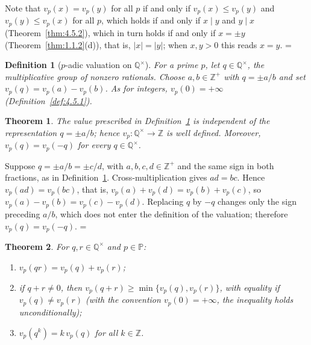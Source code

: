 \documentclass[11pt]{article}
\makeatletter
\theoremstyle{ntstyle}
\newtheorem{theorem}{Theorem}[subsection]
\newtheorem{definition}{Definition}[subsection]
\let\nt@closedisplay\]
\def\nt@guardedclose{\@ifnextchar\par{\nt@closeafterpar}{\@ifnextchar\end{\postdisplaypenalty\@M\nt@closedisplay}{\nt@closedisplay}}}
\def\nt@closeafterpar\par{\@ifnextchar\par{\nt@closeafterpar}{\@ifnextchar\end{\postdisplaypenalty\@M\nt@closedisplay\par}{\nt@closedisplay\par}}}
\renewenvironment{proof}[1][\proofname]{\par
  \pushQED{\qed}\normalfont\topsep\medskipamount\edef\nt@afterproof{\@endparpenalty=\the\@endparpenalty\relax}\@beginparpenalty\@M\@endparpenalty\@M\let\]\nt@guardedclose\trivlist\item[]\textit{#1\@addpunct{.}} \ignorespaces}{\ifvmode\addpenalty\@M\fi\popQED\nt@afterproof\endtrivlist\@endpefalse}
\newcommand{\Primes}{\mathbb{P}}
\makeatother
\begin{document}
\begin{proof} Note that $v_p(x) = v_p(y)$ for all $p$ if and only if $v_p(x) \le v_p(y)$ and
$v_p(y) \le v_p(x)$ for all $p$, which holds if and only if $x \mid y$ and $y \mid x$
(Theorem~\ref{thm:4.5.2}), which in turn holds if and only if $x = \pm y$
(Theorem~\ref{thm:1.1.2}(d)), that is, $|x| = |y|$; when $x, y > 0$ this reads $x = y$.
\end{proof}
\begin{definition}[$p$-adic valuation on $\mathbb{Q}^{\times}$]\label{def:4.5.2} For a prime $p$, let $q \in \mathbb{Q}^{\times}$, the multiplicative group
	of nonzero rationals. Choose
	$a,b\in\mathbb{Z}^+$ with $q=\pm a/b$ and set
	$v_p(q)=v_p(a)-v_p(b)$. As for integers, $v_p(0)=+\infty$ (Definition~\ref{def:4.5.1}).
\end{definition}
\begin{theorem}\label{thm:4.5.4} The value prescribed in Definition~\ref{def:4.5.2} is
	independent of the representation $q=\pm a/b$; hence
	$v_p:\mathbb{Q}^{\times}\to\mathbb{Z}$ is well defined. Moreover,
	$v_p(q)=v_p(-q)$ for every $q\in\mathbb{Q}^{\times}$.
\end{theorem}

\begin{proof} Suppose $q=\pm a/b=\pm c/d$, with
	$a,b,c,d \in \mathbb{Z}^+$ and the same sign in both fractions, as in
	Definition~\ref{def:4.5.2}. Cross-multiplication gives $ad = bc$. Hence $v_p(ad) =
		v_p(bc)$, that is, $v_p(a) + v_p(d) = v_p(b) + v_p(c)$, so
	$v_p(a) - v_p(b) = v_p(c) - v_p(d)$. Replacing $q$ by $-q$ changes only
	the sign preceding $a/b$, which does not enter
	the definition of the valuation; therefore $v_p(q)=v_p(-q)$.
\end{proof}
\begin{theorem}\label{thm:4.5.5} For $q, r \in \mathbb{Q}^{\times}$ and
	$p \in \Primes$:

	\begin{enumerate}[label={\alph*)}]
		\item $v_p(qr) = v_p(q) + v_p(r)$;
		\item if $q + r \neq 0$, then $v_p(q + r) \ge \min\{v_p(q), v_p(r)\}$, with equality if
					$v_p(q) \neq v_p(r)$ (with the convention $v_p(0) = +\infty$, the inequality holds unconditionally);
		\item $v_p(q^{k}) = k\, v_p(q)$ for all $k \in \mathbb{Z}$.
	\end{enumerate}
\end{theorem}
\end{document}
